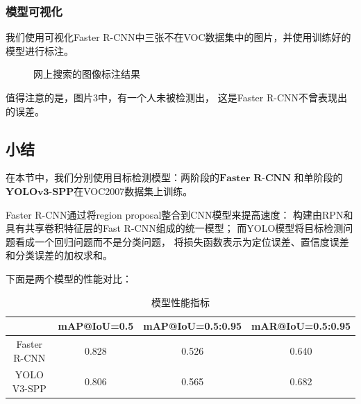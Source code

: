 \documentclass[UTF8]{ctexart}
\begin{document}
\subsubsection{模型可视化}

我们使用可视化Faster R-CNN中三张不在VOC数据集中的图片，并使用训练好的模型进行标注。
\begin{figure}[!ht]
    \centering
    \hspace{0.5in}
    \caption{网上搜索的图像标注结果}
\end{figure}

值得注意的是，图片3中，有一个人未被检测出，
这是Faster R-CNN不曾表现出的误差。

\subsection{小结}
在本节中，我们分别使用目标检测模型：两阶段的$\textbf{Faster R-CNN}$
和单阶段的$\textbf{YOLOv3-SPP}$在VOC2007数据集上训练。

Faster R-CNN通过将region proposal整合到CNN模型来提高速度：
构建由RPN和具有共享卷积特征层的Fast R-CNN组成的统一模型；
而YOLO模型将目标检测问题看成一个回归问题而不是分类问题，
将损失函数表示为定位误差、置信度误差和分类误差的加权求和。

下面是两个模型的性能对比：

\begin{table}[!ht]
    \begin{center}
        \begin{tabular}{cccc}
            \hline
            & mAP@IoU=0.5  & mAP@IoU=0.5:0.95 & mAR@IoU=0.5:0.95 \\ \hline
            Faster R-CNN & 0.828 & 0.526 & 0.640 \\ \hline
            YOLO V3-SPP & 0.806 & 0.565 & 0.682 \\ \hline
            \end{tabular}
        \caption{模型性能指标}
    \end{center}
\end{table}
\end{document}
